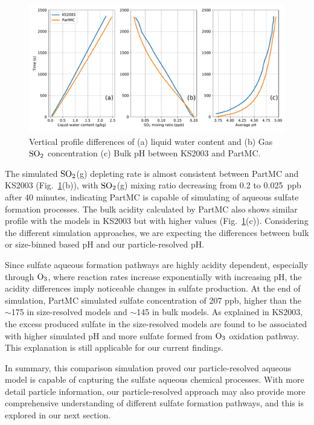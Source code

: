 \documentclass[edeposit,fullpage]{uiucthesis2009}
\begin{document}
\begin{figure}[ht]
    \centering \includegraphics[scale=0.5]{chap2_figs/chap2_fig1_profile.pdf}
    \caption{Vertical profile differences of (a) liquid water content and (b) Gas $\rm SO_2$ concentration (c) Bulk pH between KS2003 and PartMC.}
    \label{chap2:ks2003}
\end{figure}

The simulated $\rm SO_2$(g) depleting rate is almost consistent between PartMC and KS2003 (Fig.~\ref{chap2:ks2003}(b)), with $\rm SO_2$(g) mixing ratio decreasing from 0.2 to 0.025~ppb after 40 minutes, indicating PartMC is capable of simulating of aqueous sulfate formation processes. The bulk acidity calculated by PartMC also shows similar profile with the models in KS2003 but with higher values (Fig.~\ref{chap2:ks2003}(c)). Considering the different simulation approaches, we are expecting the differences between bulk or size-binned based pH and our particle-resolved pH. 

Since sulfate aqueous formation pathways are highly acidity dependent, especially through $\rm O_3$, where reaction rates increase exponentially with increasing pH, the acidity differences imply noticeable changes in sulfate production. At the end of simulation, PartMC simulated sulfate concentration of 207 ppb, higher than the $\sim$175 in size-resolved models and $\sim$145 in bulk models. As explained in KS2003, the excess produced sulfate in the size-resolved models are found to be associated with higher simulated pH and more sulfate formed from $\rm O_3$ oxidation pathway. This explanation is still applicable for our current findings. 

In summary, this comparison simulation proved our particle-resolved aqueous model is capable of capturing the sulfate aqueous chemical processes. 
With more detail particle information, our particle-resolved approach may also provide more comprehensive understanding of different sulfate formation pathways, and this is explored in our next section. 
\end{document}
